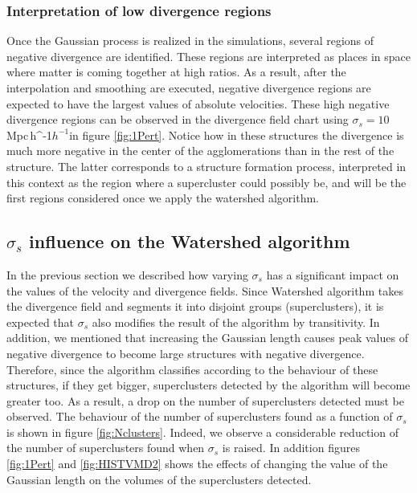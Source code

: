 \documentclass[usenatbib]{mnras}
\newcommand{\Mpch}{\,{\rm Mpc}\,\ifmmode h^{-1}\else $h^{-1}$\fi}
\begin{document}
\subsubsection{Interpretation of low divergence regions}
Once the Gaussian process is realized in the simulations, several
regions of negative divergence are identified. These regions are
interpreted as places in space where matter is coming together at high
ratios. As a result, after the interpolation and smoothing are
executed, negative divergence regions are expected to have the largest
values of absolute velocities. These high negative divergence regions
can be observed in the divergence field chart using $\sigma_s =
10$\,\Mpch in figure \ref{fig:1Pert}. Notice how in these structures
the divergence is much more negative in the center of the
agglomerations than in the rest of the structure. The latter
corresponds to a structure formation process, interpreted in this
context as the region where a supercluster could possibly be, and will
be the first regions considered once we apply the watershed
algorithm. 


\subsection{$\sigma_s$ influence on the Watershed algorithm}


In the previous section we described how varying $\sigma_s$ has a
significant impact on the values of the velocity and divergence
fields. Since Watershed algorithm takes the divergence field and
segments it into disjoint groups (superclusters), it is expected that
$\sigma_s$ also modifies the result of the algorithm by
transitivity. In addition, we mentioned that increasing the Gaussian
length causes peak values of negative divergence to become large
structures with negative divergence. Therefore, since the algorithm
classifies according to the behaviour of these structures, if they get
bigger, superclusters detected by the algorithm will become greater
too. As a result, a drop on the number of superclusters detected must
be observed. The behaviour of the number of superclusters found as a
function of $\sigma_s$ is shown in figure \ref{fig:Nclusters}. Indeed,
we observe a considerable reduction of the number of superclusters
found when $\sigma_s$ is raised. In addition figures \ref{fig:1Pert}
and \ref{fig:HISTVMD2} shows the effects of changing the value of the
Gaussian length on the volumes of the superclusters detected. 
\end{document}
